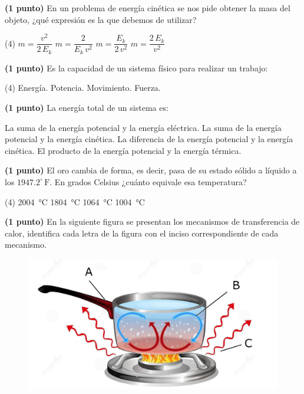 \documentclass[12pt, letter]{exam}
\newcommand{\Fahrenheit}[1]{{#1}^{\circ} \,  \text{F}}
\begin{document}
\begin{questions}
    \question \textbf{(1 punto)} En un problema de energía cinética se nos pide obtener la masa del objeto, ¿qué expresión es la que debemos de utilizar?
    \begin{tasks}(4)
        \task $m = \dfrac{v^{2}}{2 \, E_{k}}$
        \task $m = \dfrac{2}{E_{k} \, v^{2}}$
        \task $m = \dfrac{E_{k}}{2 \, v^{2}}$
        \task $m = \dfrac{2 \, E_{k}}{v^{2}}$
    \end{tasks}
    \question \textbf{(1 punto)} Es la capacidad de un sistema físico para realizar un trabajo:
    \begin{tasks}(4)
        \task Energía.
        \task Potencia.
        \task Movimiento.
        \task Fuerza.
    \end{tasks}
    \question \textbf{(1 punto)} La energía total de un sistema es:
    \begin{tasks}
        \task La suma de la energía potencial y la energía eléctrica.
        \task La suma de la energía potencial y la energía cinética.
        \task La diferencia de la energía potencial y la energía cinética.
        \task El producto de la energía potencial y la energía térmica.
    \end{tasks}
    \question \textbf{(1 punto)} El oro cambia de forma, es decir, pasa de su estado sólido a líquido a los $\Fahrenheit{1947.2}$. En grados Celsius ¿cuánto equivale esa temperatura?
    \begin{tasks}(4)
        \task \SI{2004}{\degreeCelsius}
        \task \SI{1804}{\degreeCelsius}
        \task \SI{1064}{\degreeCelsius}
        \task \SI{1004}{\degreeCelsius}
    \end{tasks}
    \question \textbf{(1 punto)} En la siguiente figura se presentan los mecanismos de transferencia de calor, identifica cada letra de la figura con el inciso correspondiente de cada mecanismo.
    \begin{figure}[H]
        \centering
        \includegraphics[scale=0.2]{Transferencia_Calor_01.jpg}

\end{figure}
\end{questions}
\end{document}
